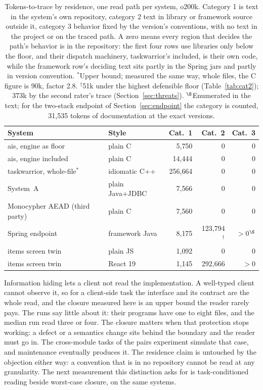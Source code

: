 \documentclass[journal]{IEEEtran}
\begin{document}
\begin{table}[H]
\centering
\footnotesize\setlength{\tabcolsep}{1.3pt}
\begin{tabular}{@{}llrrr@{}}
\toprule
System & Style & Cat.~1 & Cat.~2 & Cat.~3 \\
\midrule
ais, engine as floor & plain C & 5{,}750 & 0 & 0 \\
ais, engine included & plain C & 14{,}444 & 0 & 0 \\
taskwarrior, whole-file$^{*}$ & idiomatic C++ & 256{,}664 & 0 & 0 \\
System~A & plain Java+JDBC & 7{,}566 & 0 & 0 \\
Monocypher AEAD (third party) & plain C & 7{,}560 & 0 & 0 \\
Spring endpoint & framework Java & 8{,}175 & 123{,}794$^{\dagger}$ & $>$0$^{\S}$ \\
items screen twin & plain JS & 1{,}092 & 0 & 0 \\
items screen twin & React 19 & 1{,}145 & 292{,}666 & $>$0 \\
\bottomrule
\end{tabular}
\caption{Tokens-to-trace by residence, one read path per system, o200k.
Category 1 is text in the system's own repository, category 2 text in
library or framework source outside it, category 3 behavior fixed by the
version's conventions, with no text in the project or on the traced path. A zero means every
region that decides the path's behavior is in the repository: the first four rows use libraries only below the floor, and
their dispatch machinery, taskwarrior's included, is their own code, while
the framework row's deciding text sits partly in the Spring jars and
partly in version convention.
$^{*}$Upper bound; measured the same way, whole files, the C figure is 90k, factor 2.8.
$^{\dagger}$51k under the highest defensible floor (Table~\ref{tab:cat2}); 373k by the second rater's trace (Section~\ref{sec:threats}).
$^{\S}$Enumerated in the text; for the two-stack endpoint of
Section~\ref{sec:endpoint} the category is counted, 31,535 tokens of
documentation at the exact versions.}
\label{tab:quad}
\end{table}

Information
hiding lets a client not read the implementation. A well-typed client
cannot observe it, so for a client-side task the interface and its
contract are the whole read, and the closure measured here is an upper
bound the reader rarely pays. The runs say little about it: their
programs have one to eight files, and the median run read three or
four. The closure matters when that protection
stops working: a defect or a semantics change sits behind the boundary
and the reader must go in. The cross-module tasks of the pairs
experiment simulate that case, and maintenance eventually produces it. The residence claim is
untouched by the objection either way: a convention that is in no
repository cannot be read at any granularity. The next measurement this distinction asks for is task-conditioned
reading beside worst-case closure, on the same systems.
\end{document}
